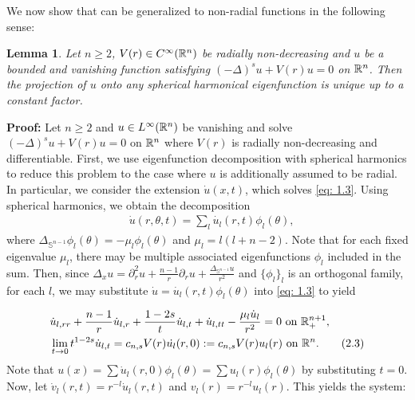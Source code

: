 \documentclass{article}
\newtheorem{lemma}[theorem]{Lemma}
\begin{document}
We now show that \cite[Thm 1]{Frank}  can be generalized to non-radial functions in the following sense:

\begin{lemma}
\label{lm 2.2}
Let $n \ge 2$, $V(r) \in C^\infty(\mathbb{R}^n)$ be radially non-decreasing and $u$ be a bounded and vanishing function satisfying $(-\Delta)^s u+ V(r) u=0$ on $\mathbb{R}^n$. Then the projection of $u$ onto any spherical harmonical eigenfunction is unique up to a constant factor.
\end{lemma}

\noindent
\textbf{Proof:}  Let $n \ge 2$ and $u \in L^\infty(\mathbb{R}^n)$ be vanishing and solve $(-\Delta)^s u + V(r)u= 0$ on $\mathbb{R}^n$ where $V(r)$ is radially non-decreasing and differentiable. First, we use eigenfunction decomposition with spherical harmonics to reduce this problem to the case where $u$ is additionally assumed to be radial. In particular, we consider the extension $\dot{u}(x, t)$, which solves \eqref{eq: 1.3}. Using spherical harmonics, we obtain the decomposition
\begin{align*}
    &\dot{u}(r, \theta, t) = \sum_l \dot{u_l}(r,t)\phi_{l}(\theta),
\end{align*}
where $\Delta_{\mathbb{S}^{n-1}}\phi_{l}(\theta) = 
-\mu_{l}\phi_{l}(\theta)$ and $\mu_l= l(l+n-2)$. Note that for each fixed eigenvalue $\mu_l$, there may be multiple associated eigenfunctions $\phi_l$ included in the sum. Then, since $\Delta_x u = \partial_r^2 u + \frac{n-1}{r} \partial_r u + \frac{ \Delta_{\mathbb{S}^{n-1}} u}{r^2}$ and $\{\phi_l\}_l$ is an orthogonal family, for each $l$, we may substitute $\dot{u}=\dot{u_l}(r,t)\phi_l(\theta)$ into \eqref{eq: 1.3} to yield

\begin{align*}
    & \dot{u}_{l, rr} + \frac{n-1}{r}\dot{u}_{l,r} + \frac{1-2s}{t}\dot{u}_{l,t} + \dot{u}_{l, tt} - \frac{\mu_l \dot{u}_l}{r^2} = 0 \textrm{ on } \mathbb{R}^{n+1}_+,\\
    & \lim\limits_{t \to 0} t^{1-2s}\dot{u}_{l,t}  = c_{n,s} V(r)\dot{u_l}(r,0) := c_{n,s}V(r)u_l(r) \textrm{ on } \mathbb{R}^n.
     \tag{2.3} \label{eq: 2.3}
\end{align*}
Note that $u(x) =\sum \dot{u}_l(r,0)\phi_{l}(\theta) =\sum u_l(r)\phi_{l}(\theta)$ by substituting $t=0$. Now, let $\dot{v}_l(r,t) = r^{-l} \dot{u}_l(r,t)$ and $v_l(r) = r^{-l} u_l(r)$. This yields the system:
\end{document}
